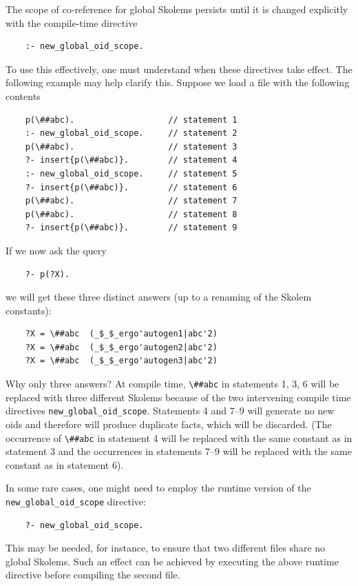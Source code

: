 \documentclass[11pt]{article}
\newcommand{\bs}{\textbackslash}
\begin{document}
The scope of co-reference for global Skolems
persists until it is changed explicitly with
the compile-time directive
\begin{verbatim}
    :- new_global_oid_scope.
\end{verbatim}
To use this effectively, one must understand when these
directives take effect. The following example may help clarify this. Suppose
we load a file with the following contents
\begin{verbatim}
    p(\##abc).                   // statement 1
    :- new_global_oid_scope.     // statement 2
    p(\##abc).                   // statement 3
    ?- insert{p(\##abc)}.        // statement 4
    :- new_global_oid_scope.     // statement 5
    ?- insert{p(\##abc)}.        // statement 6
    p(\##abc).                   // statement 7
    p(\##abc).                   // statement 8
    ?- insert{p(\##abc)}.        // statement 9
\end{verbatim}
If we now ask the query
\begin{verbatim}
    ?- p(?X).
\end{verbatim}
we will get these three distinct answers (up to a renaming of the Skolem
constants):
\begin{verbatim}
    ?X = \##abc  (_$_$_ergo'autogen1|abc'2)
    ?X = \##abc  (_$_$_ergo'autogen2|abc'2)
    ?X = \##abc  (_$_$_ergo'autogen3|abc'2)
\end{verbatim}
Why only three answers? At compile time, \texttt{\bs{}\#\#abc} in
statements 1, 3, 6 will be
replaced with
three different Skolems because of the two intervening compile time directives
\verb|new_global_oid_scope|.
Statements 4 and 7--9 will generate no new oids and therefore
will produce duplicate facts, which will be discarded. (The occurrence of
\texttt{\bs{}\#\#abc} in statement 4 will be replaced with the same
constant as in statement 3 and the occurrences in statements 7--9 will be
replaced with the same constant as in statement 6).

In some rare cases, one might need to employ the runtime version of
the \verb|new_global_oid_scope| directive:
\begin{verbatim}
    ?- new_global_oid_scope.
\end{verbatim}
This may be needed, for instance, to ensure that two different files share
no global Skolems.
Such an effect can be achieved by executing the above runtime directive
before compiling the second file.
\end{document}
